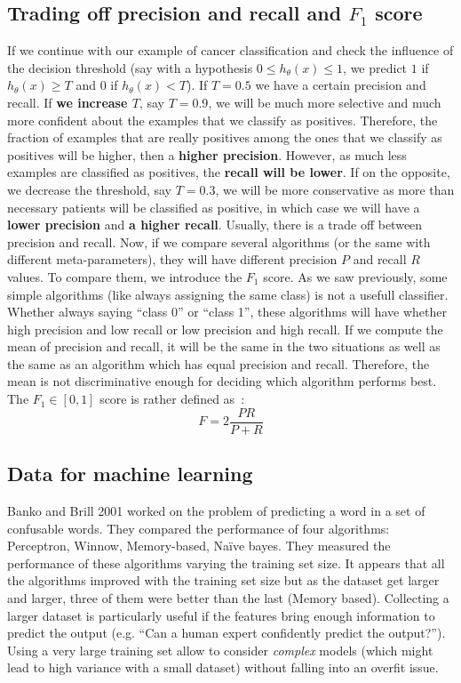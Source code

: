\documentclass[10pt,a4paper]{article}
\begin{document}
\subsection{Trading off precision and recall and $F_1$ score}

If we continue with our example of cancer classification and check the
influence of the decision threshold (say with a hypothesis
$0 \leq h_\theta(x) \leq 1$, we predict $1$ if $h_\theta(x) \geq T$
and $0$ if $h_\theta(x) < T$). If $T = 0.5$ we have a certain
precision and recall. If \textbf{we increase $T$}, say $T=0.9$, we will be much
more selective and much more confident about the examples that we
classify as positives. Therefore, the fraction of examples that are
really positives among the ones that we classify as positives will be
higher, then a \textbf{higher precision}. However, as much less examples are
classified as positives, the \textbf{recall will be lower}. If on the
opposite, we decrease the threshold, say $T=0.3$, we will be more
conservative as more than necessary patients will be classified as
positive, in which case we will have a \textbf{lower precision} and \textbf{a
higher recall}. Usually, there is a trade off between precision and
recall. Now, if we compare several algorithms (or the same with
different meta-parameters), they will have different precision $P$ and
recall $R$ values. To compare them, we introduce the $F_1$ score. As
we saw previously, some simple algorithms (like always assigning the
same class) is not a usefull classifier. Whether always saying ``class
0'' or ``class 1'', these algorithms will have whether high precision
and low recall or low precision and high recall. If we compute the
mean of precision and recall, it will be the same in the two
situations as well as the same as an algorithm which has equal
precision and recall. Therefore, the mean is not discriminative enough
for deciding which algorithm performs best. The $F_1 \in [0,1]$ score is rather
defined as~:
\begin{equation}
F = 2 \frac{P R}{P + R}
\end{equation}


\subsection{Data for machine learning}

Banko and Brill 2001 worked on the problem of predicting a word in a set of confusable
words. They compared the performance of four algorithms: Perceptron,
Winnow, Memory-based, Naïve bayes. They measured the performance of
these algorithms varying the training set size. It appears that all
the algorithms improved with the training set size but as the dataset
get larger and larger, three of them were better than the last (Memory
based). Collecting a larger dataset is particularly useful if the
features bring enough information to predict the output (e.g. ``Can a
human expert confidently predict the output?''). Using a very large
training set allow to consider \emph{complex} models (which might lead
to high variance with a small dataset) without falling into an overfit issue.
\end{document}
